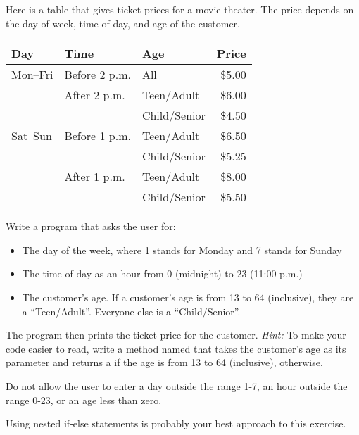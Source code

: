 \begin{exercise}
Here is a table that gives ticket prices for a movie theater. The price depends on the day of week, time of day, and age of the customer.

\renewcommand{\arraystretch}{1.5}  %

\begin{tabular}{|l|l|l|r|}
\hline
Day & Time & Age & Price \\ \hline
Mon--Fri & Before 2 p.m. & All & \$5.00 \\ \cline {2-4}
& After 2 p.m. & Teen/Adult & \$6.00 \\
& & Child/Senior & \$4.50\\ \hline
Sat--Sun & Before 1 p.m. & Teen/Adult & \$6.50 \\
& & Child/Senior & \$5.25 \\ \cline{2-4}
& After 1 p.m. & Teen/Adult & \$8.00 \\
& & Child/Senior & \$5.50 \\ \hline
\end{tabular}

\renewcommand{\arraystretch}{1.0} %

Write a program that asks the user for:
\begin{itemize}
\item The day of the week, where 1 stands for Monday and 7 stands for Sunday
\item The time of day as an hour from 0 (midnight) to 23 (11:00 p.m.)
\item The customer's age. If a customer's age is from 13 to 64 (inclusive), they are a ``Teen/Adult''. Everyone else is a ``Child/Senior''.
\end{itemize}

The program then prints the ticket price for the customer. {\em Hint:} To make your code easier to read, write a method named  that takes the customer's age as its parameter and returns a   if the age is from 13 to 64 (inclusive),  otherwise.

Do not allow the user to enter a day outside the range 1-7, an hour outside the range 0-23, or an age less than zero.

Using nested if-else statements is probably your best approach to this exercise.
\end{exercise}

